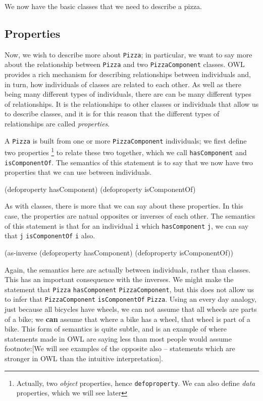 We now have the basic classes that we need to describe a pizza.


\subsection{Properties}
\label{sec-5-3}

Now, we wish to describe more about \verb~Pizza~; in particular, we want to say
more about the relationship between \verb~Pizza~ and two \verb~PizzaComponent~ classes.
OWL provides a rich mechanism for describing relationships between individuals
and, in turn, how individuals of classes are related to each other. As well as
there being many different types of individuals, there are can be many
different types of relationships. It is the relationships to other classes or
individuals that allow us to describe classes, and it is for this reason that
the different types of relationships are called \emph{properties}.

A \verb~Pizza~ is built from one or more \verb~PizzaComponent~ individuals; we first
define two properties \footnote{Actually, two \emph{object} properties, hence
\verb~defoproperty~. We can also define \emph{data} properties, which we will see later}
to relate these two together, which we call \verb~hasComponent~ and
\verb~isComponentOf~. The semantics of this statement is to say that we now have
two properties that we can use between individuals.

\begin{tawny}
(defoproperty hasComponent)
(defoproperty isComponentOf)
\end{tawny}

As with classes, there is more that we can say about these properties. In this
case, the properties are natual opposites or inverses of each other. The
semantics of this statement is that for an individual \verb~i~ which \verb~hasComponent~
\verb~j~, we can say that \verb~j~ \verb~isComponentOf~ \verb~i~ also. 

\begin{tawny}
(as-inverse
 (defoproperty hasComponent)
 (defoproperty isComponentOf))
\end{tawny}

Again, the semantics here are actually between individuals, rather than
classes. This has an important consequence with the inverses. We might make
the statement that \verb~Pizza~ \verb~hasComponent~ \verb~PizzaComponent~, but this does not
allow us to infer that \verb~PizzaComponent~ \verb~isComponentOf~ \verb~Pizza~. Using an
every day analogy, just because all bicycles have wheels, we can not assume
that all wheels are parts of a bike; we \textbf{can} assume that where a bike has a
wheel, that wheel is part of a bike. This form of semantics is quite subtle,
and is an example of where statements made in OWL are saying less than most
people would assume footnote:[We will see examples of the opposite also --
statements which are stronger in OWL than the intuitive interpretation].

